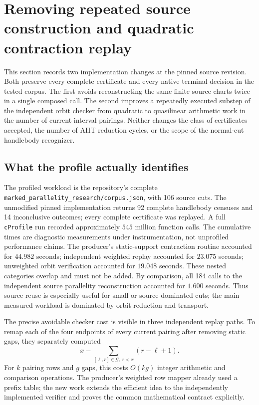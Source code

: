 \section{Removing repeated source construction and quadratic contraction replay}
\label{sec:implementation-prefix}

This section records two implementation changes at the pinned source
revision.  Both preserve every
complete certificate and every native terminal decision in the tested corpus.
The first avoids reconstructing the same finite source charts twice in a
single composed call.  The second improves a repeatedly executed substep of
the independent orbit checker from quadratic to quasilinear arithmetic work
in the number of current interval pairings.  Neither changes the class of
certificates accepted, the number of AHT reduction cycles, or the scope of the
normal-cut handlebody recognizer.

\subsection{What the profile actually identifies}

The profiled workload is the repository's complete
\texttt{marked\_parallelity\_research/corpus.json}, with 106 source cuts.  The
unmodified pinned implementation returns 92 complete handlebody censuses and
14 inconclusive outcomes; every complete certificate was replayed.  A full
\texttt{cProfile} run recorded approximately $545$ million function calls.
The cumulative times are diagnostic measurements under instrumentation, not
unprofiled performance claims.  The producer's static-support contraction
routine accounted for $44.982$ seconds; independent weighted replay accounted
for $23.075$ seconds; unweighted orbit verification accounted for $19.048$
seconds.  These nested categories overlap and must not be added.  By
comparison, all 184 calls to the independent source parallelity reconstruction
accounted for $1.600$ seconds.  Thus source reuse is especially useful for
small or source-dominated cuts; the main measured workload is dominated by
orbit reduction and transport.

The precise avoidable checker cost is visible in three independent replay
paths.  To remap each of the four endpoints of every current pairing after
removing static gaps, they separately computed
\[
 x-\sum_{[\ell,r]\in\mathcal G,\ r<x}(r-\ell+1).
\]
For $k$ pairing rows and $g$ gaps, this costs $O(kg)$ integer arithmetic and
comparison operations.  The producer's weighted row mapper already used a
prefix table; the new work extends the efficient idea to the independently
implemented verifier and proves the common mathematical contract explicitly.


